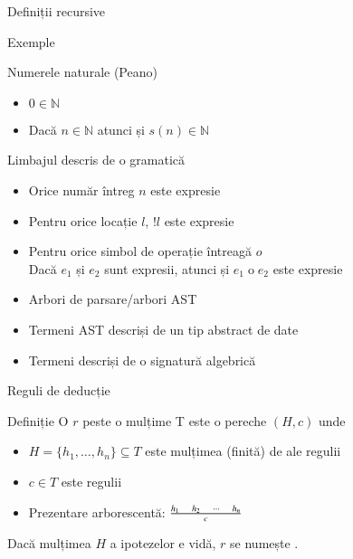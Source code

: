 \documentclass[xcolor=pdftex,romanian,colorlinks]{beamer}
\begin{document}
\begin{section}{Definiții recursive}

\begin{frame}{}{Exemple}
  \begin{block}{Numerele naturale (Peano)}
      \begin{itemize}
      \item $0 \in \mathbb{N}$
       \item Dacă $n \in \mathbb{N}$ atunci și $s(n) \in \mathbb{N}$
      \end{itemize}
  \end{block}
  \begin{block}{Limbajul descris de o gramatică \hfill 
\begin{minipage}{.35\columnwidth} \renewcommand{\syntaxKeyword}{}\syntax[\Exp]{\Int\Smid\terminal{!}\Loc \Smid \Exp\op \Exp}{}\end{minipage}}
     \begin{itemize}
	 \item Orice număr întreg $n$ este expresie
         \item Pentru orice locație $l$, $\mathrel{!} l$ este expresie
         \item Pentru orice simbol de operație întreagă $o$\\
              Dacă $e_1$ și $e_2$ sunt expresii, atunci și $e_1 \mathrel{o} e_2$ este expresie
      \end{itemize}
  \end{block}
  \begin{itemize} 
        \item Arbori de parsare/arbori AST
        \item Termeni AST descriși de un tip abstract de date
       \item Termeni descriși de o signatură algebrică
\end{itemize}
\end{frame}

\begin{frame}{Reguli de deducție}
   \begin{block}{Definiție}
        O  $r$ peste o mulțime T este o pereche $(H,c)$ unde 
         \begin{itemize}
             \item $H = \{h_1,\ldots,h_n\}\subseteq T$ este mulțimea (finită) de  ale regulii
             \item $c\in T$ este  regulii
            \item Prezentare arborescentă: $\reg{c}{h_1\si h_2 \si \cdots \si h_n}{}$
         \end{itemize}         
        Dacă mulțimea $H$ a ipotezelor e vidă, $r$ se numește .
   \end{block}


\end{frame}
\end{section}
\end{document}
